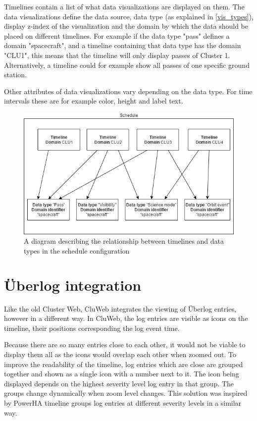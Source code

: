 Timelines contain a list of what data visualizations are displayed on them. The data visualizations define the data source, data type (as explained in \ref{vis_types}), display z-index of the visualization and the domain by which the data should be placed on different timelines. For example if the data type "pass" defines a domain "spacecraft", and a timeline containing that data type has the domain "CLU1", this means that the timeline will only display passes of Cluster 1. Alternatively, a timeline could for example show all passes of one specific ground station.

Other attributes of data visualizations vary depending on the data type. For time intervals these are for example color, height and label text.

\begin{figure}[ht]
  \begin{center}
    \includegraphics*[width=1\textwidth]{schedule_diagram}
  \end{center}
  \caption{A diagram describing the relationship between timelines and data types in the schedule configuration}
  \label{fig:schedule_diagram}
\end{figure}


\section{Überlog integration}
Like the old Cluster Web, CluWeb integrates the viewing of Überlog entries, however in a different way. In CluWeb, the log entries are visible as icons on the timeline, their positions corresponding the log event time. 

Because there are so many entries close to each other, it would not be viable to display them all as the icons would overlap each other when zoomed out. To improve the readability of the timeline, log entries which are close are grouped together and shown as a single icon with a number next to it. The icon being displayed depends on the highest severity level log entry in that group. The groups change dynamically when zoom level changes. This solution was inspired by PowerHA timeline groups log entries at different severity levels in a similar way. \cite{ibm_timeline}

